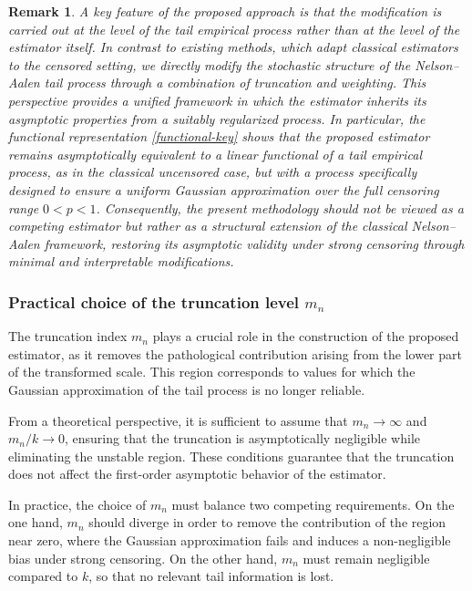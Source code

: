 \documentclass[reqno,openbib,runningheads,a4paper,12pt]{amsart}%
\newtheorem{remark}{Remark}[section]
\begin{document}
\begin{remark}
A key feature of the proposed approach is that the modification is carried out
at the level of the tail empirical process rather than at the level of the
estimator itself. In contrast to existing methods, which adapt classical
estimators to the censored setting, we directly modify the stochastic
structure of the Nelson--Aalen tail process through a combination of
truncation and weighting. This perspective provides a unified framework in
which the estimator inherits its asymptotic properties from a suitably
regularized process. In particular, the functional representation
\eqref{functional-key} shows that the proposed estimator remains
asymptotically equivalent to a linear functional of a tail empirical process,
as in the classical uncensored case, but with a process specifically designed
to ensure a uniform Gaussian approximation over the full censoring range
$0<p<1$. Consequently, the present methodology should not be viewed as a
competing estimator but rather as a structural extension of the classical
Nelson--Aalen framework, restoring its asymptotic validity under strong
censoring through minimal and interpretable modifications.
\end{remark}

\subsubsection{\textbf{Practical choice of the truncation level }$m_{n}$
\textbf{\label{choice_mn}}}

\noindent The truncation index $m_{n}$ plays a crucial role in the
construction of the proposed estimator, as it removes the pathological
contribution arising from the lower part of the transformed scale. This region
corresponds to values for which the Gaussian approximation of the tail process
is no longer reliable.\smallskip

\noindent From a theoretical perspective, it is sufficient to assume that
$m_{n}\rightarrow\infty$ and $m_{n}/k\rightarrow0$, ensuring that the
truncation is asymptotically negligible while eliminating the unstable region.
These conditions guarantee that the truncation does not affect the first-order
asymptotic behavior of the estimator.\smallskip

\noindent In practice, the choice of $m_{n}$ must balance two competing
requirements. On the one hand, $m_{n}$ should diverge in order to remove the
contribution of the region near zero, where the Gaussian approximation fails
and induces a non-negligible bias under strong censoring. On the other hand,
$m_{n}$ must remain negligible compared to $k$, so that no relevant tail
information is lost.\smallskip
\end{document}
